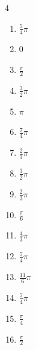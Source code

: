 \begin{multicols}{4}
\begin{enumerate}
  \item $\displaystyle \frac{5}{4}\pi$

  \item $\displaystyle 0$

  \item $\displaystyle \frac{\pi}{2}$

  \item $\displaystyle \frac{3}{2}\pi$

  \item $\displaystyle \pi$

  \item $\displaystyle \frac{7}{4}\pi$

  \item $\displaystyle \frac{2}{3}\pi$

  \item $\displaystyle \frac{3}{2}\pi$

  \item $\displaystyle \frac{2}{3}\pi$

  \item $\displaystyle \frac{\pi}{6}$

\columnbreak %

  \item $\displaystyle \frac{4}{3}\pi$

  \item $\displaystyle \frac{7}{4}\pi$

  \item $\displaystyle \frac{11}{6}\pi$

  \item $\displaystyle \frac{7}{4}\pi$

  \item $\displaystyle \frac{\pi}{4}$

  \item $\displaystyle \frac{\pi}{2}$


\end{enumerate}
\end{multicols}
